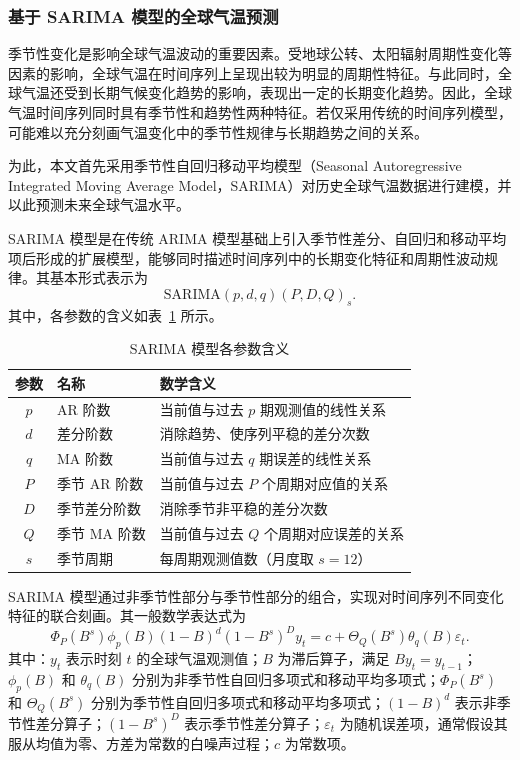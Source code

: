 \subsubsection{基于 SARIMA 模型的全球气温预测}

季节性变化是影响全球气温波动的重要因素。受地球公转、太阳辐射周期性变化等因素的影响，全球气温在时间序列上呈现出较为明显的周期性特征。与此同时，全球气温还受到长期气候变化趋势的影响，表现出一定的长期变化趋势。因此，全球气温时间序列同时具有季节性和趋势性两种特征。若仅采用传统的时间序列模型，可能难以充分刻画气温变化中的季节性规律与长期趋势之间的关系。

为此，本文首先采用季节性自回归移动平均模型（Seasonal Autoregressive Integrated Moving Average Model，SARIMA）对历史全球气温数据进行建模，并以此预测未来全球气温水平。

SARIMA 模型是在传统 ARIMA 模型基础上引入季节性差分、自回归和移动平均项后形成的扩展模型，能够同时描述时间序列中的长期变化特征和周期性波动规律。其基本形式表示为
\begin{equation}
    \mathrm{SARIMA}(p,d,q)(P,D,Q)_s.
\end{equation}
其中，各参数的含义如表~\ref{tab:q1b-sarima-params} 所示。

\begin{table}[htbp]
    \centering
    \small
    \caption{SARIMA 模型各参数含义}
    \label{tab:q1b-sarima-params}
    \begin{tabular}{@{}cp{3.2cm}p{6.5cm}@{}}
        \toprule
        参数 & 名称 & 数学含义 \\
        \midrule
        $p$ & AR 阶数 & 当前值与过去 $p$ 期观测值的线性关系\\
        $d$ & 差分阶数 & 消除趋势、使序列平稳的差分次数\\
        $q$ & MA 阶数 & 当前值与过去 $q$ 期误差的线性关系\\
        $P$ & 季节 AR 阶数 & 当前值与过去 $P$ 个周期对应值的关系\\
        $D$ & 季节差分阶数 & 消除季节非平稳的差分次数\\
        $Q$ & 季节 MA 阶数 & 当前值与过去 $Q$ 个周期对应误差的关系\\
        $s$ & 季节周期 & 每周期观测值数（月度取 $s=12$）\\
        \bottomrule
    \end{tabular}
\end{table}

SARIMA 模型通过非季节性部分与季节性部分的组合，实现对时间序列不同变化特征的联合刻画。其一般数学表达式为
\begin{equation}
    \Phi_P(B^s)\phi_p(B)(1-B)^d(1-B^s)^D y_t
    = c+\Theta_Q(B^s)\theta_q(B)\varepsilon_t.
    \label{eq:q1b-sarima-general}
\end{equation}
其中：$y_t$ 表示时刻 $t$ 的全球气温观测值；$B$ 为滞后算子，满足 $By_t=y_{t-1}$；$\phi_p(B)$ 和 $\theta_q(B)$ 分别为非季节性自回归多项式和移动平均多项式；$\Phi_P(B^s)$ 和 $\Theta_Q(B^s)$ 分别为季节性自回归多项式和移动平均多项式；$(1-B)^d$ 表示非季节性差分算子；$(1-B^s)^D$ 表示季节性差分算子；$\varepsilon_t$ 为随机误差项，通常假设其服从均值为零、方差为常数的白噪声过程；$c$ 为常数项。

